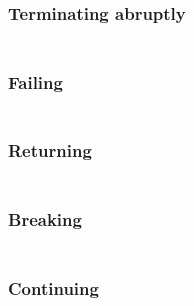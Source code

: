 \subsubsection*{Terminating abruptly}\hypertarget{terminating-abruptly}{}\label{terminating-abruptly}

\begin{align*}
  [ ~ 
  \KEY{Funcon} ~ & \NAMEHYPER{../../../../../Funcons-beta/Computations/Abnormal}{Abrupting}{finalise-abrupting}
  ~ ]
\end{align*}
\subsubsection*{Failing}\hypertarget{failing}{}\label{failing}

\begin{align*}
  [ ~ 
  \KEY{Funcon} ~ & \NAMEHYPER{../../../../../Funcons-beta/Computations/Abnormal}{Failing}{fail} \\
  \KEY{Funcon} ~ & \NAMEHYPER{../../../../../Funcons-beta/Computations/Abnormal}{Failing}{else} \\
  \KEY{Funcon} ~ & \NAMEHYPER{../../../../../Funcons-beta/Computations/Abnormal}{Failing}{checked}
  ~ ]
\end{align*}
\subsubsection*{Returning}\hypertarget{returning}{}\label{returning}

\begin{align*}
  [ ~ 
  \KEY{Funcon} ~ & \NAMEHYPER{../../../../../Funcons-beta/Computations/Abnormal}{Returning}{return} \\
  \KEY{Funcon} ~ & \NAMEHYPER{../../../../../Funcons-beta/Computations/Abnormal}{Returning}{handle-return}
  ~ ]
\end{align*}
\subsubsection*{Breaking}\hypertarget{breaking}{}\label{breaking}

\begin{align*}
  [ ~ 
  \KEY{Funcon} ~ & \NAMEHYPER{../../../../../Funcons-beta/Computations/Abnormal}{Breaking}{break} \\
  \KEY{Funcon} ~ & \NAMEHYPER{../../../../../Funcons-beta/Computations/Abnormal}{Breaking}{handle-break}
  ~ ]
\end{align*}
\subsubsection*{Continuing}\hypertarget{continuing}{}\label{continuing}

